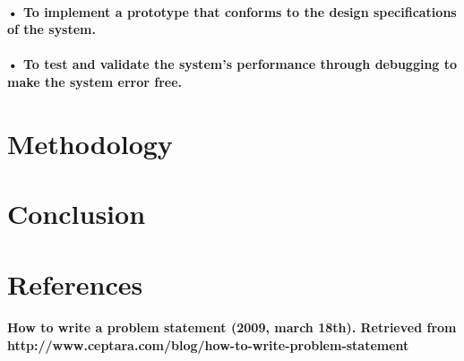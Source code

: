 \documentclass[12pt]{report}
\begin{document}
\paragraph{•	To implement a prototype that conforms to the design specifications of the system.}
\paragraph{•	To test and validate the system’s performance through debugging to make the system error free.}

\section{Methodology}
\paragraph{}
\section{Conclusion}
\section{References}
\paragraph{How to write a problem statement (2009, march 18th). Retrieved from   http://www.ceptara.com/blog/how-to-write-problem-statement}
\end{document}
